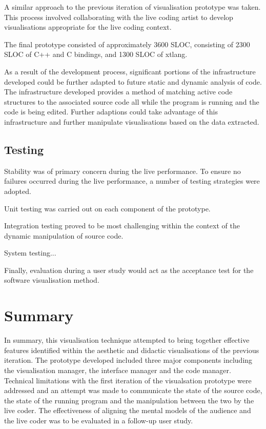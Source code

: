 A similar approach to the previous iteration of visualisation prototype was taken. This process involved collaborating with the live coding artist to develop visualisations appropriate for the live coding context. 

\more

The final prototype consisted of approximately 3600 \acf{SLOC}, consisting of 2300 \ac{SLOC} of C++ and C bindings, and 1300 \ac{SLOC} of xtlang.


As a result of the development process, significant portions of the infrastructure developed could be further adapted to future static and dynamic analysis of code. The infrastructure developed provides a method of matching active code structures to the associated source code all while the program is running and the code is being edited. Further adaptions could take advantage of this infrastructure and further manipulate visualisations based on the data extracted.


\subsection{Testing}

Stability was of primary concern during the live performance. To ensure no failures occurred during the live performance, a number of testing strategies were adopted.

Unit testing was carried out on each component of the prototype.

Integration testing proved to be most challenging within the context of the dynamic manipulation of source code. 

System testing...

Finally, evaluation during a user study would act as the acceptance test for the software visualisation method.

\section{Summary}

In summary, this visualisation technique attempted to bring together effective features identified within the aesthetic and didactic visualisations of the previous iteration. The prototype developed included three major components including the visualisation manager, the interface manager and the code manager. Technical limitations with the first iteration of the visualsation prototype were addressed and an attempt was made to communicate the state of the source code, the state of the running program and the manipulation between the two by the live coder. The effectiveness of aligning the mental models of the audience and the live coder was to be evaluated in a follow-up user study.


